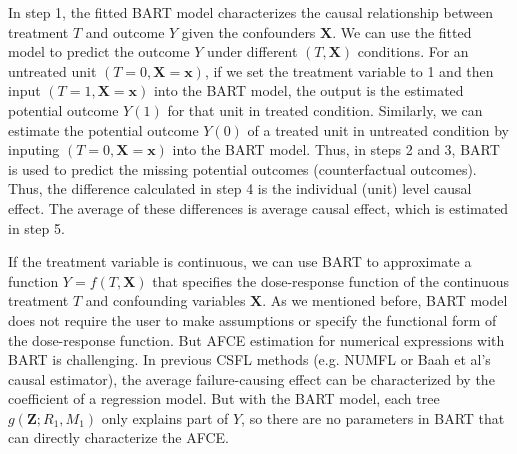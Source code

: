In step 1, the fitted BART model characterizes the causal relationship between treatment $T$ and outcome $Y$ given the confounders $\pmb{X}$. We can use the fitted model to predict the outcome $Y$ under different $(T, \pmb{X})$ conditions. For an untreated unit $(T=0, \pmb{X}=\pmb{x})$,  if we set the treatment variable to 1 and then input $(T=1, \pmb{X}=\pmb{x})$ into the BART model, the output is the estimated potential outcome $Y(1)$ for that unit in treated condition. Similarly, we can estimate the potential outcome $Y(0)$ of a treated unit in untreated condition by inputing $(T=0, \pmb{X}=\pmb{x})$ into the BART model. Thus, in steps 2 and 3, BART is used to predict the missing potential outcomes (counterfactual outcomes). Thus, the difference calculated in step 4 is the individual (unit) level causal effect. The average of these differences is average causal effect, which is estimated in step 5.

If the treatment variable is continuous,  we can use BART to approximate a function $Y=f(T,\pmb{X})$ that specifies the dose-response function of the continuous treatment $T$ and confounding variables $\pmb{X}$.  As we mentioned before, BART model does not require the user to make assumptions or specify the functional form of the dose-response function.  But AFCE estimation for numerical expressions with BART is challenging. In previous CSFL methods (e.g. NUMFL or Baah et al’s causal estimator), the average failure-causing effect can be characterized by the coefficient of a regression model.  But with the BART model, each tree $g(\pmb{Z};{R_1},{M_1})$ only explains part of $Y$, so there are no parameters in BART that can directly characterize the AFCE. 

